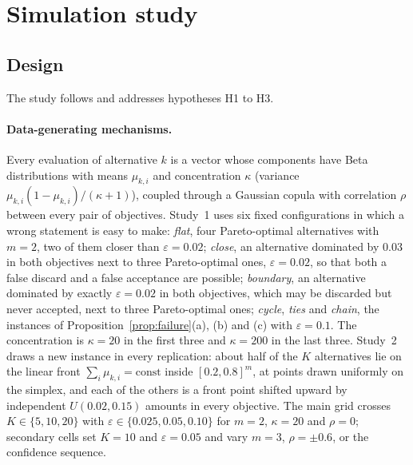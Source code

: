 \section{Simulation study}\label{sec:simulation}

\subsection{Design}\label{sec:sim-design}

The study follows \citet{morris2019} and addresses hypotheses H1 to H3.

\paragraph{Data-generating mechanisms.} Every evaluation of alternative $k$ is a vector whose components have Beta distributions with means $\mu_{k,i}$ and concentration $\kappa$ (variance $\mu_{k,i}(1-\mu_{k,i})/(\kappa+1)$), coupled through a Gaussian copula with correlation $\rho$ between every pair of objectives. Study~1 uses six fixed configurations in which a wrong statement is easy to make: \emph{flat}, four Pareto-optimal alternatives with $m=2$, two of them closer than $\varepsilon=0.02$; \emph{close}, an alternative dominated by $0.03$ in both objectives next to three Pareto-optimal ones, $\varepsilon=0.02$, so that both a false discard and a false acceptance are possible; \emph{boundary}, an alternative dominated by exactly $\varepsilon=0.02$ in both objectives, which may be discarded but never accepted, next to three Pareto-optimal ones; \emph{cycle}, \emph{ties} and \emph{chain}, the instances of Proposition~\ref{prop:failure}(a), (b) and (c) with $\varepsilon=0.1$. The concentration is $\kappa=20$ in the first three and $\kappa=200$ in the last three. Study~2 draws a new instance in every replication: about half of the $K$ alternatives lie on the linear front $\sum_i\mu_{k,i}=\text{const}$ inside $[0.2,0.8]^m$, at points drawn uniformly on the simplex, and each of the others is a front point shifted upward by independent $U(0.02,0.15)$ amounts in every objective. The main grid crosses $K\in\{5,10,20\}$ with $\varepsilon\in\{0.025,0.05,0.10\}$ for $m=2$, $\kappa=20$ and $\rho=0$; secondary cells set $K=10$ and $\varepsilon=0.05$ and vary $m=3$, $\rho=\pm0.6$, or the confidence sequence.

